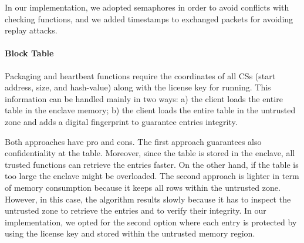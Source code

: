 In our implementation, we adopted semaphores in order to avoid conflicts
with checking functions, and we added timestamps to exchanged packets for 
avoiding replay attacks.

\paragraph{\textbf{Block Table}}
Packaging and heartbeat functions require the coordinates of all 
CSs (start address, size, and hash-value) along with the license key
for running.
This information can be handled mainly in two ways:
a) the client loads the entire table in the enclave memory;
b) the client loads the entire table in the untrusted zone and adds a digital 
fingerprint to guarantee entries integrity.

Both approaches have pro and cons. The first approach guarantees also 
confidentiality
at the table.
Moreover, since the table is stored in the enclave, all trusted functions can
retrieve the entries faster.
On the other hand, if the table is too large the enclave might be overloaded.
The second approach is lighter in term of memory consumption because it keeps 
all
rows within the untrusted zone. However, in this case, the algorithm results 
slowly because it has to
inspect the untrusted zone to retrieve the entries and to verify
their integrity.
In our implementation, we opted for the second option where each entry is 
protected
by using the license key and stored within the untrusted memory region.


